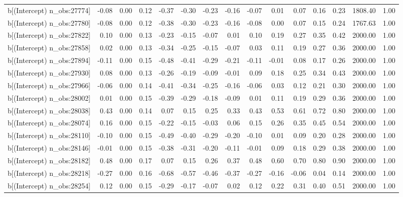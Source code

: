 \begin{table}[ht]
\begin{tabular}{rrrrrrrrrrrrrrr}
  b[(Intercept) n\_obs:27774] & -0.08 & 0.00 & 0.12 & -0.37 & -0.30 & -0.23 & -0.16 & -0.07 & 0.01 & 0.07 & 0.16 & 0.23 & 1808.40 & 1.00 \\ 
  b[(Intercept) n\_obs:27780] & -0.08 & 0.00 & 0.12 & -0.38 & -0.30 & -0.23 & -0.16 & -0.08 & 0.00 & 0.07 & 0.15 & 0.24 & 1767.63 & 1.00 \\ 
  b[(Intercept) n\_obs:27822] & 0.10 & 0.00 & 0.13 & -0.23 & -0.15 & -0.07 & 0.01 & 0.10 & 0.19 & 0.27 & 0.35 & 0.42 & 2000.00 & 1.00 \\ 
  b[(Intercept) n\_obs:27858] & 0.02 & 0.00 & 0.13 & -0.34 & -0.25 & -0.15 & -0.07 & 0.03 & 0.11 & 0.19 & 0.27 & 0.36 & 2000.00 & 1.00 \\ 
  b[(Intercept) n\_obs:27894] & -0.11 & 0.00 & 0.15 & -0.48 & -0.41 & -0.29 & -0.21 & -0.11 & -0.01 & 0.08 & 0.17 & 0.26 & 2000.00 & 1.00 \\ 
  b[(Intercept) n\_obs:27930] & 0.08 & 0.00 & 0.13 & -0.26 & -0.19 & -0.09 & -0.01 & 0.09 & 0.18 & 0.25 & 0.34 & 0.43 & 2000.00 & 1.00 \\ 
  b[(Intercept) n\_obs:27966] & -0.06 & 0.00 & 0.14 & -0.41 & -0.34 & -0.25 & -0.16 & -0.06 & 0.03 & 0.12 & 0.21 & 0.30 & 2000.00 & 1.00 \\ 
  b[(Intercept) n\_obs:28002] & 0.01 & 0.00 & 0.15 & -0.39 & -0.29 & -0.18 & -0.09 & 0.01 & 0.11 & 0.19 & 0.29 & 0.36 & 2000.00 & 1.00 \\ 
  b[(Intercept) n\_obs:28038] & 0.43 & 0.00 & 0.14 & 0.07 & 0.15 & 0.25 & 0.33 & 0.43 & 0.53 & 0.61 & 0.72 & 0.80 & 2000.00 & 1.00 \\ 
  b[(Intercept) n\_obs:28074] & 0.16 & 0.00 & 0.15 & -0.22 & -0.15 & -0.03 & 0.06 & 0.15 & 0.26 & 0.35 & 0.45 & 0.54 & 2000.00 & 1.00 \\ 
  b[(Intercept) n\_obs:28110] & -0.10 & 0.00 & 0.15 & -0.49 & -0.40 & -0.29 & -0.20 & -0.10 & 0.01 & 0.09 & 0.20 & 0.28 & 2000.00 & 1.00 \\ 
  b[(Intercept) n\_obs:28146] & -0.01 & 0.00 & 0.15 & -0.38 & -0.31 & -0.20 & -0.11 & -0.01 & 0.09 & 0.18 & 0.29 & 0.38 & 2000.00 & 1.00 \\ 
  b[(Intercept) n\_obs:28182] & 0.48 & 0.00 & 0.17 & 0.07 & 0.15 & 0.26 & 0.37 & 0.48 & 0.60 & 0.70 & 0.80 & 0.90 & 2000.00 & 1.00 \\ 
  b[(Intercept) n\_obs:28218] & -0.27 & 0.00 & 0.16 & -0.68 & -0.57 & -0.46 & -0.37 & -0.27 & -0.16 & -0.06 & 0.04 & 0.14 & 2000.00 & 1.00 \\ 
  b[(Intercept) n\_obs:28254] & 0.12 & 0.00 & 0.15 & -0.29 & -0.17 & -0.07 & 0.02 & 0.12 & 0.22 & 0.31 & 0.40 & 0.51 & 2000.00 & 1.00 \\ 

\end{tabular}
\end{table}

